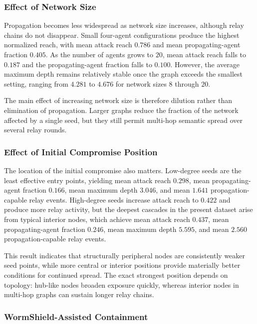 \documentclass[10pt]{article}
\begin{document}
\subsubsection{Effect of Network Size}

Propagation becomes less widespread as network size increases, although relay chains do not disappear. Small four-agent configurations produce the highest normalized reach, with mean attack reach $0.786$ and mean propagating-agent fraction $0.405$. As the number of agents grows to $20$, mean attack reach falls to $0.187$ and the propagating-agent fraction falls to $0.100$. However, the average maximum depth remains relatively stable once the graph exceeds the smallest setting, ranging from $4.281$ to $4.676$ for network sizes $8$ through $20$.

The main effect of increasing network size is therefore dilution rather than elimination of propagation. Larger graphs reduce the fraction of the network affected by a single seed, but they still permit multi-hop semantic spread over several relay rounds.

\subsubsection{Effect of Initial Compromise Position}

The location of the initial compromise also matters. Low-degree seeds are the least effective entry points, yielding mean attack reach $0.298$, mean propagating-agent fraction $0.166$, mean maximum depth $3.046$, and mean $1.641$ propagation-capable relay events. High-degree seeds increase attack reach to $0.422$ and produce more relay activity, but the deepest cascades in the present dataset arise from typical interior nodes, which achieve mean attack reach $0.437$, mean propagating-agent fraction $0.246$, mean maximum depth $5.595$, and mean $2.560$ propagation-capable relay events.

This result indicates that structurally peripheral nodes are consistently weaker seed points, while more central or interior positions provide materially better conditions for continued spread. The exact strongest position depends on topology: hub-like nodes broaden exposure quickly, whereas interior nodes in multi-hop graphs can sustain longer relay chains.

\subsubsection{WormShield-Assisted Containment}
\end{document}

